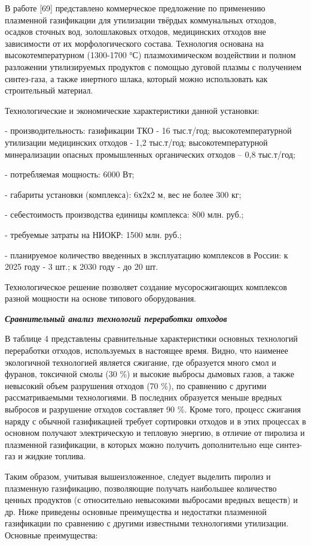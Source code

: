 \begin{multicols}{2}
В работе {[}69{]} представлено коммерческое предложение по применению
плазменной газификации для утилизации твёрдых коммунальных отходов,
осадков сточных вод, золошлаковых отходов, медицинских отходов вне
зависимости от их морфологического состава. Технология основана на
высокотемпературном (1300-1700 °С) плазмохимическом воздействии и полном
разложении утилизируемых продуктов с помощью дуговой плазмы с получением
синтез-газа, а также инертного шлака, который можно использовать как
строительный материал.

Технологические и экономические характеристики данной установки:

- производительность: газификации ТКО - 16 тыс.т/год;
высокотемпературной утилизации медицинских отходов - 1,2 тыс.т/год;
высокотемпературной минерализации опасных промышленных органических
отходов -- 0,8 тыс.т/год;

- потребляемая мощность: 6000 Вт;

- габариты установки (комплекса): 6х2х2 м, вес не более 300 кг;

- себестоимость производства единицы комплекса: 800 млн. руб.;

- требуемые затраты на НИОКР: 1500 млн. руб.;

- планируемое количество введенных в эксплуатацию комплексов в России: к
2025 году - 3 шт.; к 2030 году - до 20 шт.

Технологическое решение позволяет создание мусоросжигающих комплексов
разной мощности на основе типового оборудования.

\emph{{\bfseries Сравнительный анализ технологий переработки отходов}}

В таблице 4 представлены сравнительные характеристики основных
технологий переработки отходов, используемых в настоящее время. Видно,
что наименее экологичной технологией является сжигание, где образуется
много смол и фуранов, токсичной смолы (30 \%) и высокие выбросы дымовых
газов, а также невысокий объем разрушения отходов (70 \%), по сравнению
с другими рассматриваемыми технологиями. В последних образуется меньше
вредных выбросов и разрушение отходов составляет 90 \%. Кроме того,
процесс сжигания наряду с обычной газификацией требует сортировки
отходов и в этих процессах в основном получают электрическую и тепловую
энергию, в отличие от пиролиза и плазменной газификации, в которых можно
получить дополнительно еще синтез-газ и жидкие топлива.

Таким образом, учитывая вышеизложенное, следует выделить пиролиз и
плазменную газификацию, позволяющие получать наибольшее количество
ценных продуктов (с относительно невысокими выбросами вредных веществ) и
др. Ниже приведены основные преимущества и недостатки плазменной
газификации по сравнению с другими известными технологиями утилизации.
Основные преимущества:

\end{multicols}

